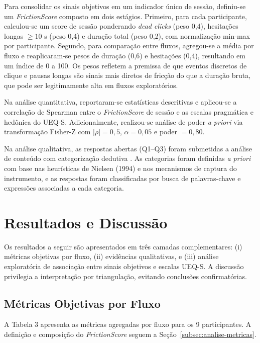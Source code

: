 \documentclass[12pt]{article}
\begin{document}
Para consolidar os sinais objetivos em um indicador único de sessão, definiu-se um \textit{FrictionScore} composto em dois estágios. Primeiro, para cada participante, calculou-se um score de sessão ponderando \textit{dead clicks} (peso 0,4), hesitações longas $\geq 10$ s (peso 0,4) e duração total (peso 0,2), com normalização min-max por participante. Segundo, para comparação entre fluxos, agregou-se a média por fluxo e reaplicaram-se pesos de duração (0,6) e hesitações (0,4), resultando em um índice de 0 a 100. Os pesos refletem a premissa de que eventos discretos de clique e pausas longas são sinais mais diretos de fricção do que a duração bruta, que pode ser legitimamente alta em fluxos exploratórios.

Na análise quantitativa, reportaram-se estatísticas descritivas e aplicou-se a correlação de Spearman entre o \textit{FrictionScore} de sessão e as escalas pragmática e hedônica do UEQ-S. Adicionalmente, realizou-se análise de poder \textit{a priori} via transformação Fisher-Z com $|\rho| = 0{,}5$, $\alpha = 0{,}05$ e poder $= 0{,}80$.

Na análise qualitativa, as respostas abertas (Q1--Q3) foram submetidas a análise de conteúdo com categorização dedutiva \cite{bardin1977}. As categorias foram definidas \textit{a priori} com base nas heurísticas de Nielsen (1994) e nos mecanismos de captura do instrumento, e as respostas foram classificadas por busca de palavras-chave e expressões associadas a cada categoria.

\section{Resultados e Discussão}

Os resultados a seguir são apresentados em três camadas complementares: (i) métricas objetivas por fluxo, (ii) evidências qualitativas, e (iii) análise exploratória de associação entre sinais objetivos e escalas UEQ-S. A discussão privilegia a interpretação por triangulação, evitando conclusões confirmatórias.

\subsection{Métricas Objetivas por Fluxo}

A Tabela 3 apresenta as métricas agregadas por fluxo para os 9 participantes. A definição e composição do \textit{FrictionScore} seguem a Seção~\ref{subsec:analise-metricas}.
\end{document}

